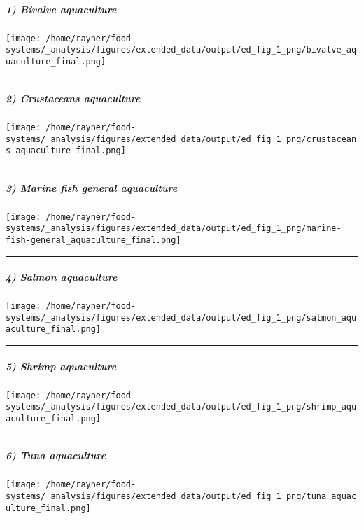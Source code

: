 \documentclass[
]{article}
\begin{document}
\hypertarget{bivalve-aquaculture}{%
\subparagraph{1) Bivalve aquaculture}\label{bivalve-aquaculture}}

\texttt{[image: /home/rayner/food-systems/\_analysis/figures/extended\_data/output/ed\_fig\_1\_png/bivalve\_aquaculture\_final.png]}

\begin{center}\rule{0.5\linewidth}{0.5pt}\end{center}

\hypertarget{crustaceans-aquaculture}{%
\subparagraph{2) Crustaceans
aquaculture}\label{crustaceans-aquaculture}}

\texttt{[image: /home/rayner/food-systems/\_analysis/figures/extended\_data/output/ed\_fig\_1\_png/crustaceans\_aquaculture\_final.png]}

\begin{center}\rule{0.5\linewidth}{0.5pt}\end{center}

\hypertarget{marine-fish-general-aquaculture}{%
\subparagraph{3) Marine fish general
aquaculture}\label{marine-fish-general-aquaculture}}

\texttt{[image: /home/rayner/food-systems/\_analysis/figures/extended\_data/output/ed\_fig\_1\_png/marine-fish-general\_aquaculture\_final.png]}

\begin{center}\rule{0.5\linewidth}{0.5pt}\end{center}

\hypertarget{salmon-aquaculture}{%
\subparagraph{4) Salmon aquaculture}\label{salmon-aquaculture}}

\texttt{[image: /home/rayner/food-systems/\_analysis/figures/extended\_data/output/ed\_fig\_1\_png/salmon\_aquaculture\_final.png]}

\begin{center}\rule{0.5\linewidth}{0.5pt}\end{center}

\hypertarget{shrimp-aquaculture}{%
\subparagraph{5) Shrimp aquaculture}\label{shrimp-aquaculture}}

\texttt{[image: /home/rayner/food-systems/\_analysis/figures/extended\_data/output/ed\_fig\_1\_png/shrimp\_aquaculture\_final.png]}

\begin{center}\rule{0.5\linewidth}{0.5pt}\end{center}

\hypertarget{tuna-aquaculture}{%
\subparagraph{6) Tuna aquaculture}\label{tuna-aquaculture}}

\texttt{[image: /home/rayner/food-systems/\_analysis/figures/extended\_data/output/ed\_fig\_1\_png/tuna\_aquaculture\_final.png]}

\begin{center}\rule{0.5\linewidth}{0.5pt}\end{center}
\end{document}
